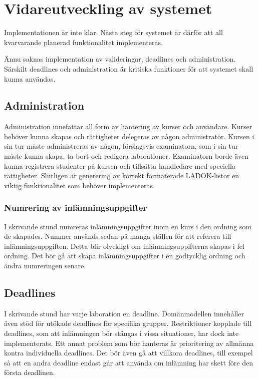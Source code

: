 \section{Vidareutveckling av systemet}

Implementationen är inte klar. Nästa steg för systemet är därför att all kvarvarande planerad funktionalitet implementeras.

Ännu saknas implementation av valideringar, deadlines och administration. Särskilt deadlines och administration är kritiska funktioner för att systemet skall kunna användas. 

\subsection{Administration}
Administration innefattar all form av hantering av kurser och användare. Kurser behöver kunna skapas och rättigheter delegeras av någon administratör. Kursen i sin tur måste administreras av någon, förslagsvis examinatorn, som i sin tur måste kunna skapa, ta bort och redigera laborationer. Examinatorn borde även kunna registrera studenter på kursen och tillsätta handledare med speciella rättigheter. Slutligen är generering av korrekt formaterade LADOK-listor en viktig funktionalitet som behöver implementeras.

\subsubsection{Numrering av inlämningsuppgifter}
I skrivande stund numreras inlämningsuppgifter inom en kurs i den ordning som de skapades. Nummer används sedan på många ställen för att referera till inlämningsuppgiften. Detta blir olyckligt om inlämningsuppifterna skapas i fel ordning. Det bör gå att skapa inlämningsuppgifter i en godtycklig ordning och ändra numreringen senare.

\subsection{Deadlines}
I skrivande stund har varje laboration en deadline. Domänmodellen innehåller även stöd för utökade deadlines för specifika grupper. Restriktioner kopplade till deadlines, som att inlämningen bör stängas i vissa situationer, har dock inte implementerats. Ett annat problem som bör hanteras är prioritering av allmänna kontra individuella deadlines. Det bör även gå att villkora deadlines, till exempel så att en andra deadline endast går att använda om inlämning har skett före den första deadlinen.

